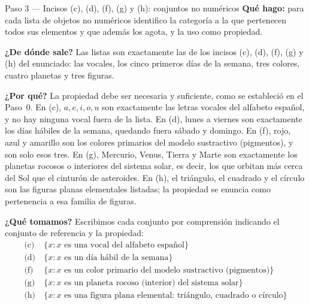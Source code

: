 \documentclass[11pt]{article}
\begin{document}
\begin{paso}{Paso 3 --- Incisos (c), (d), (f), (g) y (h): conjuntos no numéricos}
\textbf{Qué hago:} para cada lista de objetos no numéricos identifico la categoría a la que
pertenecen todos sus elementos y que además los agota, y la uso como propiedad.

\textbf{¿De dónde sale?} Las listas son exactamente las de los incisos (c), (d), (f), (g) y
(h) del enunciado: las vocales, los cinco primeros días de la semana, tres colores, cuatro
planetas y tres figuras.

\textbf{¿Por qué?} La propiedad debe ser necesaria y suficiente, como se estableció en el
Paso~0. En (c), $a,e,i,o,u$ son exactamente las letras vocales del alfabeto español, y no hay
ninguna vocal fuera de la lista. En (d), lunes a viernes son exactamente los días hábiles de
la semana, quedando fuera sábado y domingo. En (f), rojo, azul y amarillo son los colores
primarios del modelo sustractivo (pigmentos), y son solo esos tres. En (g), Mercurio, Venus,
Tierra y Marte son exactamente los planetas rocosos o interiores del sistema solar, es decir,
los que orbitan más cerca del Sol que el cinturón de asteroides. En (h), el triángulo, el
cuadrado y el círculo son las figuras planas elementales listadas; la propiedad se enuncia
como pertenencia a esa familia de figuras.

\textbf{¿Qué tomamos?} Escribimos cada conjunto por comprensión indicando el conjunto de
referencia y la propiedad:
\begin{align*}
	\text{(c)}\ & \{x : x \text{ es una vocal del alfabeto español}\}\\
	\text{(d)}\ & \{x : x \text{ es un día hábil de la semana}\}\\
	\text{(f)}\ & \{x : x \text{ es un color primario del modelo sustractivo (pigmentos)}\}\\
	\text{(g)}\ & \{x : x \text{ es un planeta rocoso (interior) del sistema solar}\}\\
	\text{(h)}\ & \{x : x \text{ es una figura plana elemental: triángulo, cuadrado o círculo}\}
\end{align*}
\end{paso}
\end{document}

